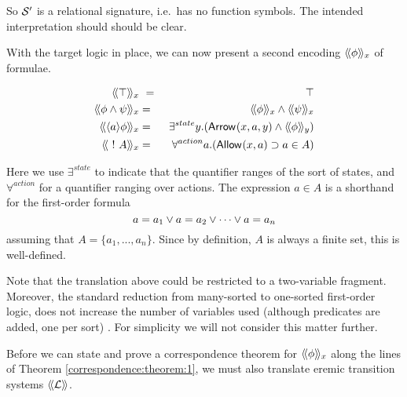 \NI So $\mathcal{S}'$ is a relational signature, i.e.~has no function
symbols.  The intended interpretation should should be
clear.

With the target logic in place, we can now present a second encoding
$\langle\!\langle \phi \rangle\!\rangle_x$ of \ELABR{} formulae.

\begin{eqnarray*}
  \SEMBTWO{\top}_x & \ = \ & \top
     \\
  \SEMBTWO{\phi \AND \psi}_x & = & \SEMBTWO{\phi}_x \AND \SEMBTWO{\psi}_x
     \\
  \SEMBTWO{\langle a \rangle \phi}_x & = & \exists^{state} y.(\ARROWTWO{}{x}{a}{y} \AND \SEMBTWO{\phi}_y)
     \\
  \SEMBTWO{\fBang A}_x & = & \forall^{action} a.(\ALLOWED{}{x}{a} \IMPLIES a \in A) 
\end{eqnarray*}

\NI Here we use $\exists^{state}$ to indicate that the quantifier ranges
of the sort of states, and $\forall^{action}$ for a quantifier ranging
over actions. The expression $a \in A$ is a shorthand for the
first-order formula
\[
   a = a_1 \lor a = a_2 \lor \cdots \lor a = a_n
\]
assuming that $A = \{a_1, ..., a_n\}$. Since by definition, $A$ is always a finite
set, this is well-defined.

Note that the translation above could be restricted to a two-variable
fragment. Moreover, the standard reduction from many-sorted to
one-sorted first-order logic, does not increase the number of
variables used (although predicates are added, one per sort)
\cite{EndertonHB:matinttl}. For simplicity we will not consider this
matter further.

Before we can state and prove a correspondence theorem for
$\langle\!\langle \phi \rangle\!\rangle_x$ along the lines of Theorem
\ref{correspondence:theorem:1}, we must also translate eremic
  transition systems $\langle\!\langle \mathcal{L} \rangle\!\rangle$.

